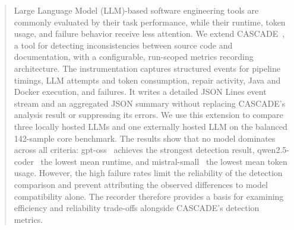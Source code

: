\begin{abstract}
Large Language Model (LLM)-based software engineering tools are commonly
evaluated by their task performance, while their runtime, token usage, and
failure behavior receive less attention. We extend CASCADE~\cite{Kiecker_2026},
a tool for detecting inconsistencies between source code and documentation, with a configurable,
run-scoped metrics recording architecture. The instrumentation captures
structured events for pipeline timings, LLM attempts and token consumption,
repair activity, Java and Docker execution, and failures. It writes a detailed
JSON Lines event stream and an aggregated JSON summary without replacing
CASCADE's analysis result or suppressing its errors. We use this extension to
compare three locally hosted LLMs and one externally hosted LLM on the balanced
142-sample core benchmark. The results show that no model dominates across all
criteria: gpt-oss~\cite{ollama_gpt_oss_20b} achieves the strongest detection
result, qwen2.5-coder~\cite{ollama_qwen2.5-coder-14b-instruct} the lowest mean
runtime, and mistral-small~\cite{ollama_mistral-small3.2_24b} the lowest mean
token usage. However, the
high failure rates limit the reliability of the detection comparison and prevent
attributing the observed differences to model compatibility alone. The recorder
therefore provides a basis for examining efficiency and reliability trade-offs
alongside CASCADE's detection metrics.

\end{abstract}
